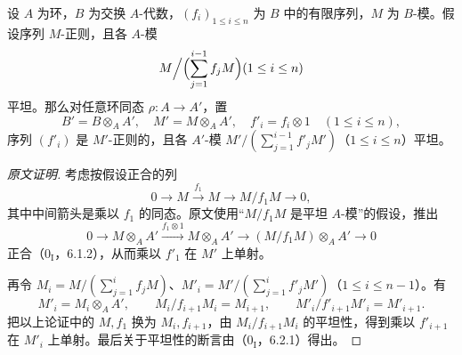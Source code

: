 设 $A$ 为环，$B$ 为交换 $A$-代数，$(f_i)_{1\leq i\leq n}$ 为 $B$ 中的有限序列，$M$ 为 $B$-模。假设序列 $M$-正则，且各 $A$-模
\[
 M\Big/\Bigl(\sum_{j=1}^{i-1}f_jM\Bigr)\qquad(1\leq i\leq n)
\]
平坦。那么对任意环同态 $\rho:A\to A'$，置
\[
 B'=B\otimes_A A',\quad M'=M\otimes_A A',\quad
 f'_i=f_i\otimes1\quad(1\leq i\leq n),
\]
序列 $(f'_i)$ 是 $M'$-正则的，且各 $A'$-模
$M'/(\sum_{j=1}^{i-1}f'_jM')$（$1\leq i\leq n$）平坦。
\begin{proof}[原文证明]
考虑按假设正合的列
\[
 0\longrightarrow M\xrightarrow{f_1}M\longrightarrow M/f_1M\longrightarrow0,
\]
其中中间箭头是乘以 $f_1$ 的同态。原文使用“$M/f_1M$ 是平坦 $A$-模”的假设，推出
\[
 0\longrightarrow M\otimes_A A'\xrightarrow{f_1\otimes1}
 M\otimes_A A'\longrightarrow(M/f_1M)\otimes_A A'\longrightarrow0
\]
正合（$0_{\mathrm I}$，6.1.2），从而乘以 $f'_1$ 在 $M'$ 上单射。

再令 $M_i=M/(\sum_{j=1}^i f_jM)$、$M'_i=M'/(\sum_{j=1}^i f'_jM')$（$1\leq i\leq n-1$）。有
\[
 M'_i=M_i\otimes_A A',\qquad
 M_i/f_{i+1}M_i=M_{i+1},\qquad
 M'_i/f'_{i+1}M'_i=M'_{i+1}.
\]
把以上论证中的 $M,f_1$ 换为 $M_i,f_{i+1}$，由 $M_i/f_{i+1}M_i$ 的平坦性，得到乘以 $f'_{i+1}$ 在 $M'_i$ 上单射。最后关于平坦性的断言由（$0_{\mathrm I}$，6.2.1）得出。
\end{proof}

